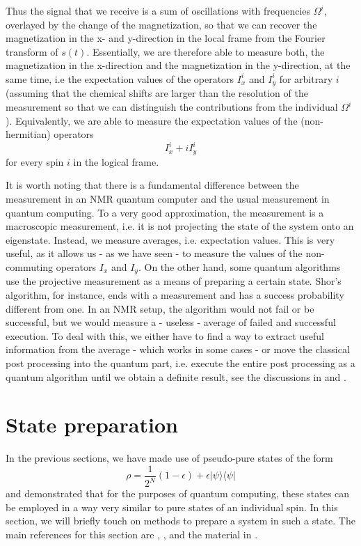\documentclass[a4paper, draft]{article}
\theoremstyle{own}
\theoremstyle{remark}
\begin{document}
Thus the signal that we receive is a sum of oscillations with frequencies $\Omega^i$, overlayed by the change of the magnetization, so that we can recover the magnetization in the x- and y-direction in the local frame from the Fourier transform of $s(t)$. Essentially, we are therefore able to measure both, the magnetization in the x-direction and the magnetization in the y-direction, at the same time, i.e the expectation values of the operators $I_x^i$ and $I_y^i$ for arbitrary $i$ (assuming that the chemical shifts are larger than the resolution of the measurement so that we can distinguish the contributions from the individual $\Omega^i$). Equivalently, we are able to measure the expectation values of the (non-hermitian) operators
$$
I_x^i + i I_y^i
$$
for every spin $i$ in the logical frame.

It is worth noting that there is a fundamental difference between the measurement in an NMR quantum computer and the usual measurement in quantum computing. To a very good approximation, the measurement is a macroscopic measurement, i.e. it is not projecting the state of the system onto an eigenstate. Instead, we measure averages, i.e. expectation values. This is very useful, as it allows us - as we have seen - to measure the values of the non-commuting operators $I_x$ and $I_y$. On the other hand, some quantum algorithms use the projective measurement as a means of preparing a certain state. Shor's algorithm, for instance, ends with a measurement and has a success probability different from one. In an NMR setup, the algorithm would not fail or be successful, but we would measure a - useless - average of failed and successful execution. To deal with this, we either have to find a way to extract useful information from the average - which works in some cases - or move the classical post processing into the quantum part, i.e. execute the entire post processing as a quantum algorithm until we obtain a definite result, see the discussions in \cite{ShorNMR} and \cite{GershenfeldChuang}.


\section{State preparation}

In the previous sections, we have made use of pseudo-pure states of the form
$$
\rho = \frac{1}{2^N} (1-\epsilon) + \epsilon |\psi \rangle \langle \psi | 
$$
and demonstrated that for the purposes of quantum computing, these states can be employed in a way very similar to pure states of an individual spin. In this section, we will briefly touch on methods to prepare a system in such a state. The main references for this section are \cite{Cory}, \cite{GershenfeldChuang}, \cite{KnillChuangLaflamme} and the material in \cite{NielsenChuang}. 
\end{document}
